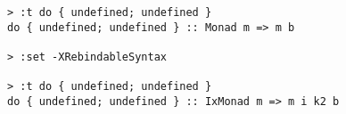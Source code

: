 \begin{repl}\begin{lstlisting}
> :t do { undefined; undefined }
do { undefined; undefined } :: Monad m => m b

> :set -XRebindableSyntax

> :t do { undefined; undefined }
do { undefined; undefined } :: IxMonad m => m i k2 b\end{lstlisting}\end{repl}
